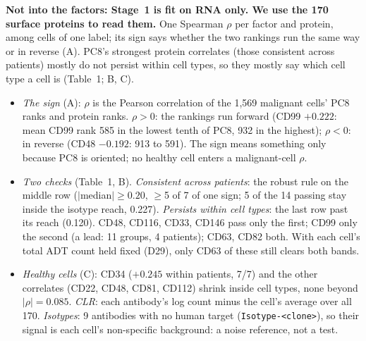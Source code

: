 

\begin{coreanswer}
\textbf{Not into the factors: Stage~1 is fit on RNA only. We use the 170 surface proteins to read them.} One Spearman $\rho$ per factor and protein, among cells of one label; its sign says whether the two rankings run the same way or in reverse (A). PC8's strongest protein correlates (those consistent across patients) mostly do not persist within cell types, so they mostly say which cell type a cell is (Table~1; B, C).
\end{coreanswer}

\evidence
\begin{itemize}[leftmargin=1.3em]
\item \emph{The sign} (A): $\rho$ is the Pearson correlation of the 1,569 malignant cells' PC8 ranks and protein ranks. $\rho > 0$: the rankings run forward (CD99 $+0.222$: mean CD99 rank 585 in the lowest tenth of PC8, 932 in the highest); $\rho < 0$: in reverse (CD48 $-0.192$: 913 to 591). The sign means something only because PC8 is oriented; no healthy cell enters a malignant-cell $\rho$.
\item \emph{Two checks} (Table~1, B). \emph{Consistent across patients}: the robust rule on the middle row ($|$median$| \geq 0.20$, $\geq$5 of 7 of one sign; 5 of the 14 passing stay inside the isotype reach, 0.227). \emph{Persists within cell types}: the last row past its reach (0.120). CD48, CD116, CD33, CD146 pass only the first; CD99 only the second (a lead: 11 groups, 4 patients); CD63, CD82 both. With each cell's total ADT count held fixed (D29), only CD63 of these still clears both bands.
\item \emph{Healthy cells} (C): CD34 ($+0.245$ within patients, 7/7) and the other correlates (CD22, CD48, CD81, CD112) shrink inside cell types, none beyond $|\rho| = 0.085$. \emph{CLR}: each antibody's log count minus the cell's average over all 170. \emph{Isotypes}: 9 antibodies with no human target (\texttt{Isotype-<clone>}), so their signal is each cell's non-specific background: a noise reference, not a test.
\end{itemize}

